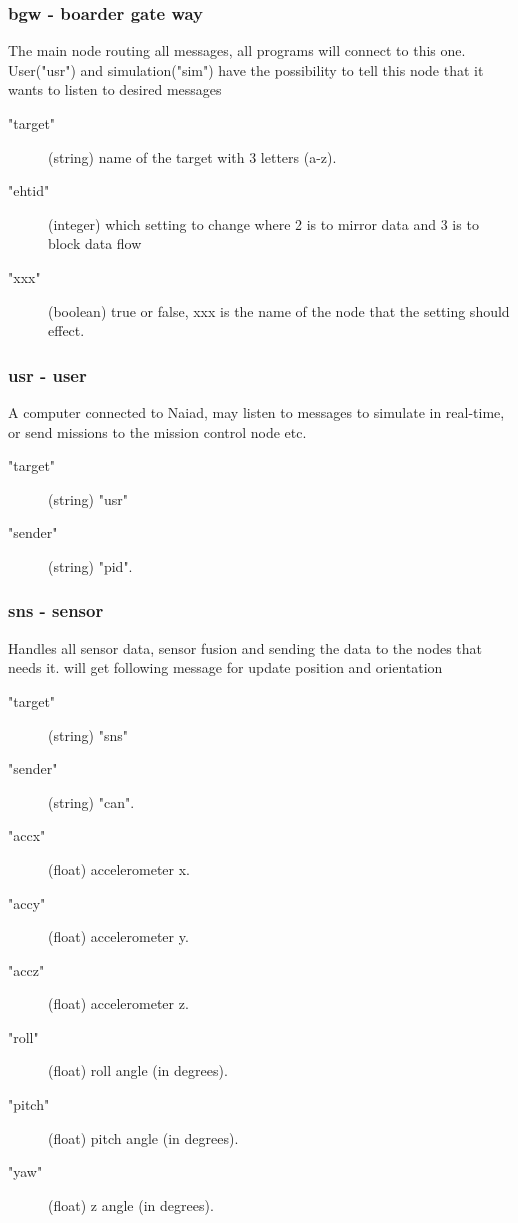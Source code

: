 \subsubsection{bgw - boarder gate way}
The main node routing all messages, all programs will connect to this one. User("usr") and simulation("sim") have the possibility to tell this node that it wants to listen to desired messages
\begin{description}
  \item["target"] (string) name of the target with 3 letters (a-z).
  \item["ehtid"] (integer) which setting to change where 2 is to mirror data and 3 is to block data flow
  \item["xxx"] (boolean) true or false, xxx is the name of the node that the setting should effect.
\end{description}

\subsubsection{usr - user}
A computer connected to Naiad, may listen to messages to simulate in real-time, or send missions to the mission control node etc.
\begin{description}
  \item["target"] (string) "usr"
  \item["sender"] (string) "pid".
\end{description}




\subsubsection{sns - sensor}
Handles all sensor data, sensor fusion and sending the data to the nodes that needs it.
will get following message for update position and orientation
\begin{description}
  \item["target"] (string) "sns"
  \item["sender"] (string) "can".
  \item["accx"] (float) accelerometer x.
  \item["accy"] (float) accelerometer y.
  \item["accz"] (float) accelerometer z.
  \item["roll"] (float) roll angle (in degrees).
  \item["pitch"] (float) pitch angle (in degrees).
  \item["yaw"] (float) z angle (in degrees).
\end{description}

